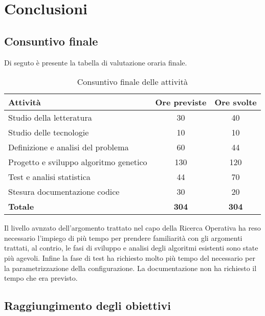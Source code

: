 \chapter{Conclusioni}
\label{cap:conclusioni}

\section{Consuntivo finale}

Di seguto è presente la tabella di valutazione oraria finale.

\begin{table}[H]
    \centering
    \begin{tabular}{|l|c|c|}
    \hline
    \textbf{Attività} & \textbf{Ore previste} & \textbf{Ore svolte} \\  \hline
    Studio della letteratura & 30 & 40 \\  \hline
    Studio delle tecnologie & 10 & 10 \\  \hline
    Definizione e analisi del problema & 60 & 44 \\  \hline
    Progetto e sviluppo algoritmo genetico & 130 & 120 \\  \hline
    Test e analisi statistica & 44 & 70 \\  \hline
    Stesura documentazione codice & 30 & 20 \\  \hline
    \textbf{Totale} & \textbf{304} & \textbf{304} \\  \hline
    \end{tabular}
    \caption{Consuntivo finale delle attività}
\end{table}

Il livello avnzato dell'argomento trattato nel capo della Ricerca Operativa ha reso necessario l'impiego di più tempo per prendere familiarità con gli argomenti trattati, al contrio, le fasi di sviluppo e analisi degli algoritmi esistenti sono state più agevoli. Infine la fase di test ha richiesto molto più tempo del necessario per la parametrizzazione della configurazione. La documentazione non ha richiesto il tempo che era previsto.

\section{Raggiungimento degli obiettivi}


